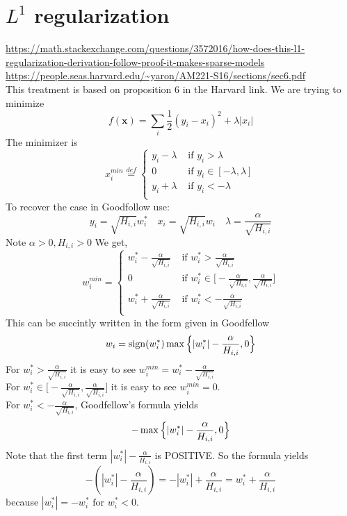 \documentclass{article}
\newcommand{\beq}{\begin{equation}}
\newcommand{\eeq}{\end{equation}}
\DeclareMathOperator{\sign}{sign}
\begin{document}
\section{$L^1$ regularization}
\url{https://math.stackexchange.com/questions/3572016/how-does-this-l1-regularization-derivation-follow-proof-it-makes-sparse-models}\\
\url{https://people.seas.harvard.edu/~yaron/AM221-S16/sections/sec6.pdf}\\
This treatment is based on proposition 6 in the Harvard link. We are trying to minimize
\beq
f(\pmb{x}) = \sum_{i}\frac{1}{2} (y_i - x_i)^2 + \lambda|x_i|
\eeq
The minimizer is
\beq
x_i^{min} \stackrel{def}{=} 
\begin{cases} 
      y_i-\lambda & \text{ if } y_i > \lambda \\
      0           & \text{ if } y_i \in [-\lambda,\lambda]\\
      y_i+\lambda & \text{ if } y_i < -\lambda \\
\end{cases}
\eeq
To recover the case in Goodfollow use:
\beq
y_i = \sqrt{H_{i,i}}w_i^* \quad x_i = \sqrt{H_{i,i}}w_i \quad \lambda = \frac{\alpha}{\sqrt{H_{i,i}}} 
\eeq
Note $\alpha>0,H_{i,i}>0$
We get,
\beq
w_i^{min} =
\begin{cases}
        w_i^*-\frac{\alpha}{\sqrt{H_{i,i}}} & \text{ if } w_i^* >  \frac{\alpha}{\sqrt{H_{i,i}}}\\
      0           & \text{ if } w_i^* \in \Big[-\frac{\alpha}{\sqrt{H_{i,i}}},\frac{\alpha}{\sqrt{H_{i,i}}}\Big]\\
      w_i^*+\frac{\alpha}{\sqrt{H_{i,i}}}  & \text{ if } w_i^* <  -\frac{\alpha}{\sqrt{H_{i,i}}}  \\
\end{cases}  
\eeq
This can be succintly written in the form given in Goodfellow
\beq
w_i = \sign({w_i^*})\max\Big{\{}|w_i^*|-\frac{\alpha}{H_{i,i}},0\Big{\}}
\eeq
For $w_i^* >  \frac{\alpha}{\sqrt{H_{i,i}}}$ it is easy to see $w_i^{min}=w_i^*-\frac{\alpha}{\sqrt{H_{i,i}}}$\\
For $w_i^* \in \Big[-\frac{\alpha}{\sqrt{H_{i,i}}},\frac{\alpha}{\sqrt{H_{i,i}}}\Big]$ it is easy to see $w_i^{min}=0.$\\
For $w_i^* <  -\frac{\alpha}{\sqrt{H_{i,i}}}$, Goodfellow's formula yields
\beq
-\max\Big{\{}|w_i^*|-\frac{\alpha}{H_{i,i}},0\Big{\}}
\eeq
Note that the first term $|w_i^*|-\frac{\alpha}{H_{i,i}}$ is POSITIVE. So the formula yields
\beq
-(|w_i^*|-\frac{\alpha}{H_{i,i}}) = -|w_i^*|+\frac{\alpha}{H_{i,i}} = w_i^* + \frac{\alpha}{H_{i,i}} 
\eeq
because $|w_i^*|=-w_i^* \text{ for } w_i^*<0$.
%
%
%
\end{document}

